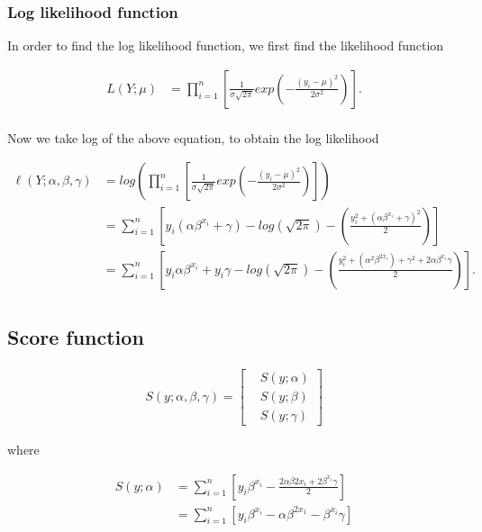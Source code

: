 \subsubsection{Log likelihood function}

In order to find the log likelihood function, we first find the likelihood function

\begin{align*}
   L(Y;\mu) &= \prod_{i=1}^n \left[\frac{1}{\sigma \sqrt{2 \pi}}exp\left(-\frac{(y_i -\mu)^2}{2 \sigma^2}\right) \right].\\
\end{align*}

Now we take log of the above equation, to obtain the log likelihood

\begin{align*}
   \ell(Y;\alpha, \beta, \gamma) &= log \left( \prod_{i=1}^n \left[\frac{1}{\sigma \sqrt{2 \pi}}exp\left(-\frac{(y_i -\mu)^2}{2 \sigma^2}\right) \right] \right)\\
   &= \sum_{i = 1}^n \left[ y_i (\alpha \beta^{x_i}+\gamma) - log\left( \sqrt{2 \pi}\right) - \left( \frac{y_i^2 + (\alpha \beta^{x_i}+\gamma)^2}{2} \right) \right] \\
   &=\sum_{i = 1}^n \left[ y_i \alpha \beta^{x_i} +y_i\gamma - log\left( \sqrt{2 \pi}\right) - \left( \frac{y_i^2 + (\alpha^2 \beta^{2x_i}) + \gamma^2 + 2\alpha\beta^{x_i}\gamma}{2}\right) \right].\\
\end{align*}

\subsection{Score function}

\begin{align*}
    S(y;\alpha,\beta,\gamma)=
    \begin{bmatrix}
    &S(y;\alpha) \\
    &S(y;\beta) \\
    &S(y;\gamma)
    \end{bmatrix} 
\end{align*}

where 

\begin{align*}
    S(y;\alpha) &=\sum_{i=1}^n \left[ y_i\beta^{x_i} - \frac{2\alpha\beta{2x_i}+2\beta^{x_i}\gamma}{2} \right] \\
    &= \sum_{i=1}^n \left[ y_i\beta^{x_i}-\alpha\beta^{2x_1}-\beta^{x_i}\gamma \right]
\end{align*}

